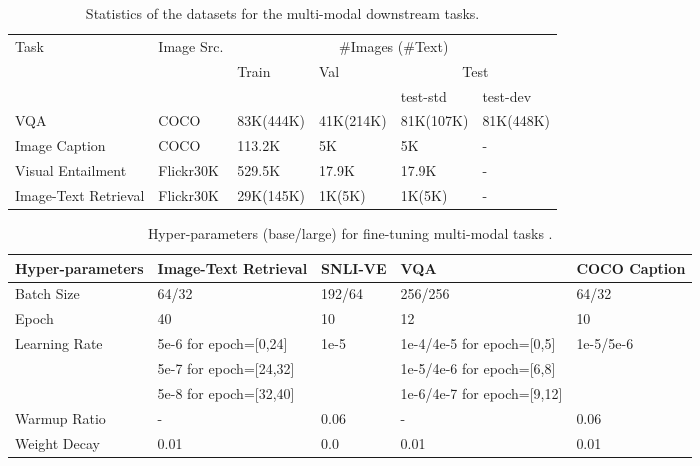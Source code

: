 \documentclass[11pt,a4paper]{article}
\begin{document}
\begin{table*}[t!]
\centering
\small
\begin{tabular}{l|l|l|l|l|l}
\hline
\multirow{3}{*}{Task} & \multirow{3}{*}{Image Src.} & \multicolumn{4}{c}{\#Images (\#Text)} \\
\cline{3-6}
&& \multirow{2}{*}{Train} & \multirow{2}{*}{Val} & \multicolumn{2}{c}{Test} \\
\cline{5-6}
&&&& test-std & test-dev \\
\hline
VQA & COCO & 83K(444K) & 41K(214K) & 81K(107K) & 81K(448K) \\
\hline
Image Caption & COCO & 113.2K & 5K & 5K & - \\
\hline
Visual Entailment & Flickr30K & 529.5K & 17.9K & 17.9K & - \\
\hline
Image-Text Retrieval & Flickr30K & 29K(145K) & 1K(5K) & 1K(5K) & - \\
\hline
\end{tabular}
\caption{\label{finetune-dataset}
Statistics of the datasets for the multi-modal downstream tasks.}
\end{table*}



\begin{table*}[t!]
\centering
\small
\begin{tabular}{l|l|l|l|l}
\hline
Hyper-parameters & Image-Text Retrieval & SNLI-VE & VQA & COCO Caption \\
\hline
\hline
Batch Size & 64/32 & 192/64 & 256/256 & 64/32 \\
\hline
Epoch & 40 & 10 & 12 & 10 \\
\hline
\multirow{3}{*}{Learning Rate} & 5e-6 for epoch=[0,24] & \multirow{3}{*}{1e-5} & 1e-4/4e-5 for epoch=[0,5] & 1e-5/5e-6 \\
& 5e-7 for epoch=[24,32] & & 1e-5/4e-6 for epoch=[6,8] & \\
& 5e-8 for epoch=[32,40] & & 1e-6/4e-7 for epoch=[9,12] & \\
\hline
Warmup Ratio & - & 0.06 & - & 0.06 \\
\hline
Weight Decay & 0.01 & 0.0 & 0.01 & 0.01 \\
\hline
\end{tabular}
\caption{\label{multimodal-params}
Hyper-parameters (base/large) for fine-tuning multi-modal tasks .}
\end{table*}
\end{document}

